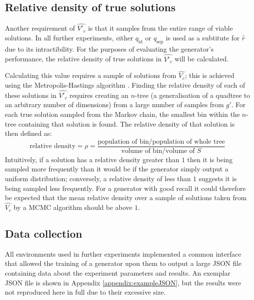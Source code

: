 \documentclass[../../main.tex]{subfiles}
\begin{document}
\subsection{Relative density of true solutions} \label{subsection:relativeDensityOfTrueSolutions}

Another requirement of $\hat{V'_c}$ is that it samples from the entire range of viable solutions.
In all further experiments, either $q_\text{id}$ or $q_\text{sep}$ is used as a subtitute for $\hat{r}$ due to its intractibility.
For the purposes of evaluating the generator's performance, the relative density of true solutions in $\hat{V'_c}$ will be calculated.

Calculating this value requires a sample of solutions from $\hat{V_c}$; this is achieved using the Metropolis-Hastings algorithm \cite{robert16}.
Finding the relative density of each of these solutions in $\hat{V'_c}$ requires creating an $n$-tree (a generalisation of a quadtree to an arbitrary number of dimensions) from a large number of samples from $g'$.
For each true solution sampled from the Markov chain, the smallest bin within the $n$-tree containing that solution is found.
The relative density of that solution is then defined as:
\begin{equation}
    \text{relative density}=\rho=\frac{\text{population of bin}/\text{population of whole tree}}{\text{volume of bin}/\text{volume of }S}
\end{equation}
Intuitively, if a solution has a relative density greater than $1$ then it is being sampled more frequently than it would be if the generator simply output a uniform distribution; conversely, a relative density of less than $1$ suggests it is being sampled less frequently.
For a generator with good recall it could therefore be expected that the mean relative density over a sample of solutions taken from $\hat{V_c}$ by a MCMC algorithm should be above $1$.

\subsection{Data collection} \label{subsection:dataCollection}

All environments used in further experiments implemented a common interface that allowed the training of a generator upon them to output a large JSON file containing data about the experiment parameters and results.
An exemplar JSON file is shown in Appendix \ref{appendix:exampleJSON}, but the results were not reproduced here in full due to their excessive size.
\end{document}
